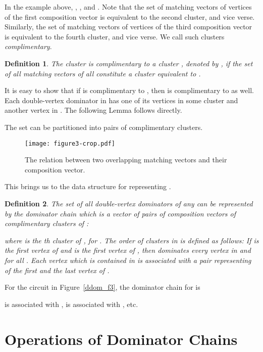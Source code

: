 \documentclass{llncs}
\newtheorem{defn}{Definition}
\begin{document}
In the example above, ,   , and .
Note that the set of matching vectors of vertices of the first composition vector 
is equivalent to the second cluster, and vice verse. Similarly, the set of matching vectors of vertices of the third composition vector is equivalent to the fourth cluster, and vice verse. We call such clusters  {\em  complimentary}.

\begin{defn} \label{cluster_comp}
The cluster is {\em complimentary} to a cluster ,
denoted by ,
if the set of all matching vectors  of all  constitute a cluster equivalent to .
\end{defn}

It is easy to show that if  is complimentary to , then  is complimentary to  as well. Each double-vertex dominator in  has one of its vertices in some cluster  and another vertex in . The following Lemma follows directly.

\begin{lemma}
The set  can be partitioned into pairs of complimentary clusters.
\end{lemma}

\begin{figure}[t!]
\begin{center}
\texttt{[image: figure3-crop.pdf]}
\caption{The relation between two overlapping matching vectors and their composition vector.} \label{comp_vector}
\end{center}
\end{figure}


This brings us to the data structure for representing .

\begin{defn} \label{ddom_d1}
The set  of all double-vertex dominators of any 
can be represented by the {\em dominator chain}  
which is a vector of pairs of composition vectors of complimentary clusters of :

where  is the th cluster of , for .
The order of clusters in  is defined as follows: 
If  is the first vertex of  and  is the first vertex of ,
then  dominates every vertex in  and  for all .
Each vertex  which is contained in  is associated
with a pair  representing of the first
and the last vertex of .
\end{defn}

For the circuit in Figure~\ref{ddom_f3}, the dominator chain for  is

 is associated with ,  is associated with , etc.

\section{Operations of Dominator Chains}
\end{document}

